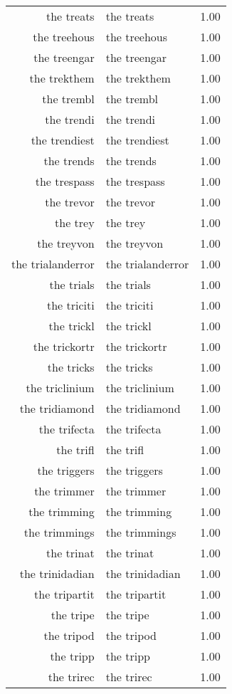 \begin{table}[ht]
\begin{tabular}{rlr}
  the treats & the treats & 1.00 \\ 
  the treehous & the treehous & 1.00 \\ 
  the treengar & the treengar & 1.00 \\ 
  the trekthem & the trekthem & 1.00 \\ 
  the trembl & the trembl & 1.00 \\ 
  the trendi & the trendi & 1.00 \\ 
  the trendiest & the trendiest & 1.00 \\ 
  the trends & the trends & 1.00 \\ 
  the trespass & the trespass & 1.00 \\ 
  the trevor & the trevor & 1.00 \\ 
  the trey & the trey & 1.00 \\ 
  the treyvon & the treyvon & 1.00 \\ 
  the trialanderror & the trialanderror & 1.00 \\ 
  the trials & the trials & 1.00 \\ 
  the triciti & the triciti & 1.00 \\ 
  the trickl & the trickl & 1.00 \\ 
  the trickortr & the trickortr & 1.00 \\ 
  the tricks & the tricks & 1.00 \\ 
  the triclinium & the triclinium & 1.00 \\ 
  the tridiamond & the tridiamond & 1.00 \\ 
  the trifecta & the trifecta & 1.00 \\ 
  the trifl & the trifl & 1.00 \\ 
  the triggers & the triggers & 1.00 \\ 
  the trimmer & the trimmer & 1.00 \\ 
  the trimming & the trimming & 1.00 \\ 
  the trimmings & the trimmings & 1.00 \\ 
  the trinat & the trinat & 1.00 \\ 
  the trinidadian & the trinidadian & 1.00 \\ 
  the tripartit & the tripartit & 1.00 \\ 
  the tripe & the tripe & 1.00 \\ 
  the tripod & the tripod & 1.00 \\ 
  the tripp & the tripp & 1.00 \\ 
  the trirec & the trirec & 1.00 \\ 

\end{tabular}
\end{table}
